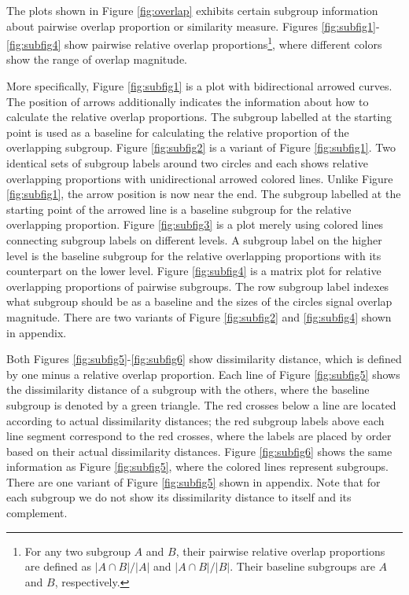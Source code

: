 \documentclass[Afour,sagev,times, doublespace]{sagej}
\begin{document}
{The plots shown in Figure \ref{fig:overlap} exhibits certain subgroup information about pairwise overlap proportion or similarity measure. Figures \ref{fig:subfig1}-\ref{fig:subfig4} show pairwise relative overlap proportions\footnote{For any two subgroup $A$ and $B$, their pairwise relative overlap proportions are defined as $|A\cap B|/ |A|$ and $|A\cap B|/ |B|$. Their baseline subgroups are $A$ and $B$, respectively.}, where different colors show the range of overlap magnitude.

More specifically, Figure \ref{fig:subfig1} is a plot with bidirectional arrowed curves. The position of arrows additionally indicates the information about how to calculate the relative overlap proportions. The subgroup labelled at the starting point is used as a baseline for calculating the relative proportion of the overlapping subgroup. Figure \ref{fig:subfig2} is a variant of Figure \ref{fig:subfig1}. Two identical sets of subgroup labels around two circles and each shows relative overlapping proportions with unidirectional arrowed colored lines. Unlike Figure \ref{fig:subfig1}, the arrow position is now near the end. The subgroup labelled at the starting point of the arrowed line is a baseline subgroup for the relative overlapping proportion. Figure \ref{fig:subfig3} is a plot merely using colored lines connecting subgroup labels on different levels. A subgroup label on the higher level is the baseline subgroup for the relative overlapping proportions with its counterpart on the lower level. Figure \ref{fig:subfig4} is a matrix plot for relative overlapping proportions of pairwise subgroups. The row subgroup label indexes what subgroup should be as a baseline and the sizes of the circles signal overlap magnitude. There are two variants of Figure \ref{fig:subfig2} and \ref{fig:subfig4} shown in appendix.

Both Figures \ref{fig:subfig5}-\ref{fig:subfig6} show dissimilarity distance, which is defined by one minus a relative overlap proportion. Each line of Figure \ref{fig:subfig5} shows the dissimilarity distance of a subgroup with the others, where the baseline subgroup is denoted by a green triangle. The red crosses below a line are located according to actual dissimilarity distances; the red subgroup labels above each line segment correspond to the red crosses, where the labels are placed by order based on their actual dissimilarity distances. Figure \ref{fig:subfig6} shows the same information as Figure \ref{fig:subfig5}, where the colored lines represent subgroups. There are one variant of Figure \ref{fig:subfig5} shown in appendix.  Note that for each subgroup we do not show its dissimilarity distance to itself and its complement.


}
\end{document}
